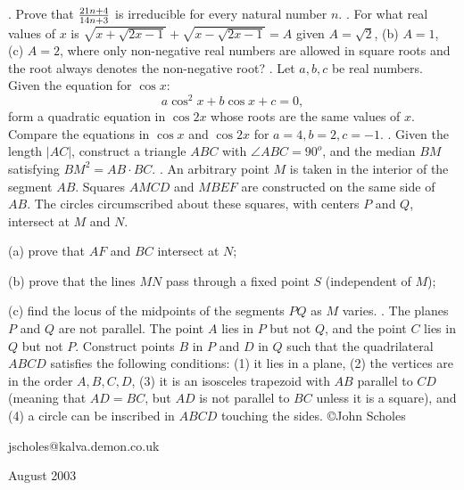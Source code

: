 \nopagenumbers
{}
\vskip 25pt
. Prove that $21n+4\over14n+3$ is irreducible for every natural number $n$.
\vskip 12pt
. For what real values of $x$ is $\sqrt{x+\sqrt{2x-1}}+\sqrt{x-\sqrt{2x-1}}=A$ given $A=\sqrt2$, (b) $A=1$, (c) $A=2$, where only non-negative real numbers are allowed in square roots and the root always denotes the non-negative root?
\vskip 12pt
. Let $a,b,c$ be real numbers. Given the equation for $\cos x$: $$a\cos^2x+b\cos x+c=0,$$ form a quadratic equation in $\cos{2x}$ whose roots are the same values of $x$. Compare the equations in $\cos x$ and $\cos{2x}$ for $a=4,b=2,c=-1$.
\vskip 12pt
. Given the length $|AC|$, construct a triangle $ABC$ with $\angle ABC=90^o$, and the median $BM$ satisfying $BM^2=AB\cdot BC$.
\vskip 12pt
. An arbitrary point $M$ is taken in the interior of the segment $AB$. Squares $AMCD$ and $MBEF$ are constructed on the same side of $AB$. The circles circumscribed about these squares, with centers $P$ and $Q$, intersect at $M$ and $N$. 

(a) prove that $AF$ and $BC$ intersect at $N$;

(b) prove that the lines $MN$ pass through a fixed point $S$ (independent of $M$);

(c) find the locus of the midpoints of the segments $PQ$ as $M$ varies.
\vskip 12pt
. The planes $P$ and $Q$ are not parallel. The point $A$ lies in $P$ but not $Q$, and the point $C$ lies in $Q$ but not $P$. Construct points $B$ in $P$ and $D$ in $Q$ such that the quadrilateral $ABCD$ satisfies the following conditions: (1) it lies in a plane, (2) the vertices are in the order $A,B,C,D$, (3) it is an isosceles trapezoid with $AB$ parallel to $CD$ (meaning that $AD=BC$, but $AD$ is not parallel to $BC$ unless it is a square), and (4) a circle can be inscribed in $ABCD$ touching the sides.
\vskip 20pt
\noindent \copyright John Scholes

\noindent jscholes@kalva.demon.co.uk

 August 2003

\bye
